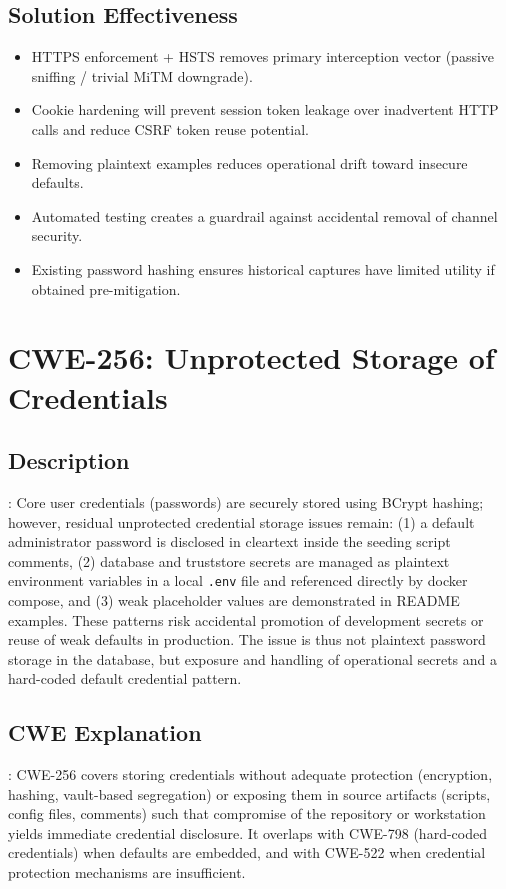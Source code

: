 \documentclass[]{UCD_CS_FYP_Report}
\begin{document}
\subsection*{Solution Effectiveness}
\begin{itemize}
	\item HTTPS enforcement + HSTS removes primary interception vector (passive sniffing / trivial MiTM downgrade).
	\item Cookie hardening will prevent session token leakage over inadvertent HTTP calls and reduce CSRF token reuse potential.
	\item Removing plaintext examples reduces operational drift toward insecure defaults.
	\item Automated testing creates a guardrail against accidental removal of channel security.
	\item Existing password hashing ensures historical captures have limited utility if obtained pre-mitigation.
\end{itemize}



\section{CWE-256: Unprotected Storage of Credentials}

	\subsection{Description}: Core user credentials (passwords) are securely stored using BCrypt hashing; however, residual unprotected credential storage issues remain: (1) a default administrator password is disclosed in cleartext inside the seeding script comments, (2) database and truststore secrets are managed as plaintext environment variables in a local \texttt{.env} file and referenced directly by docker compose, and (3) weak placeholder values are demonstrated in README examples. These patterns risk accidental promotion of development secrets or reuse of weak defaults in production. The issue is thus not plaintext password storage in the database, but exposure and handling of operational secrets and a hard-coded default credential pattern.

	\subsection{CWE Explanation}: CWE-256 covers storing credentials without adequate protection (encryption, hashing, vault-based segregation) or exposing them in source artifacts (scripts, config files, comments) such that compromise of the repository or workstation yields immediate credential disclosure. It overlaps with CWE-798 (hard-coded credentials) when defaults are embedded, and with CWE-522 when credential protection mechanisms are insufficient.
\end{document}
